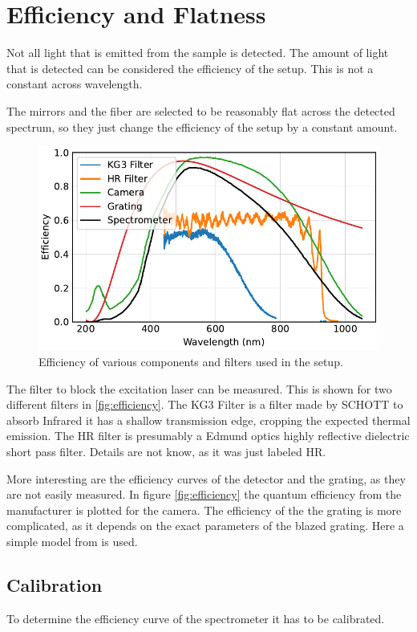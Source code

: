 \documentclass[
	parskip=half,
	a4paper,
]{scrarticle}
\begin{document}
\section{Efficiency and Flatness}
Not all light that is emitted from the sample is detected.
The amount of light that is detected can be considered the efficiency of the setup. This is not a constant across wavelength.

The mirrors and the fiber are selected to be reasonably flat across the detected spectrum, so they just change the efficiency of the setup by a constant amount.

\begin{figure}[hb]
    \centering
    \includegraphics{../analysis/figures/filter.pdf}
    \caption{Efficiency of various components and filters used in the setup.}
    \label{fig:efficiency}
\end{figure}
The filter to block the excitation laser can be measured. This is shown for two different filters in \autoref{fig:efficiency}. The KG3 Filter is a filter made by SCHOTT to absorb Infrared it has a shallow transmission edge, cropping the expected thermal emission.
The HR filter is presumably a Edmund optics highly reflective dielectric short pass filter. Details are not know, as it was just labeled HR.

More interesting are the efficiency curves of the detector and the grating, as they are not easily measured. In figure \autoref{fig:efficiency} the quantum efficiency from the manufacturer is plotted for the camera. The efficiency of the the grating is more complicated, as it depends on the exact parameters of the blazed grating. Here a simple model from \cite{barker_ripple_1984} is used.



\subsection{Calibration}
To determine the efficiency curve of the spectrometer it has to be calibrated.
\end{document}
